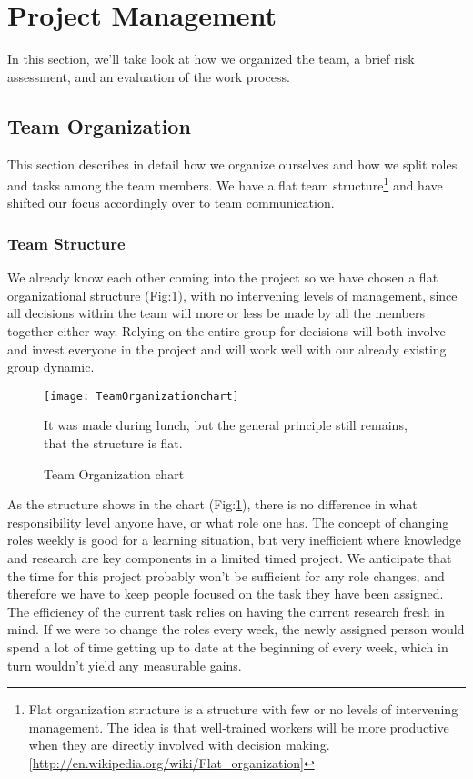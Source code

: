 \section{Project Management}\label{Project Management} 
    In this section, we'll take look at how we organized the team, a brief risk assessment, and an evaluation of the work process. 
    
    \subsection{Team Organization}\label{Team Organization} 
        This section describes in detail how we organize ourselves and how we split roles and tasks among the team members. We have a flat team structure\footnote{Flat organization structure is a structure with few or no levels of intervening management. The idea is that well-trained workers will be more productive when they are directly involved with decision making. [\url{http://en.wikipedia.org/wiki/Flat_organization}]}  and have shifted our focus accordingly over to team communication. 
    
    \subsubsection{Team Structure}\label{Team Structure}
    We already know each other coming into the project so we have chosen a flat organizational structure (Fig:\ref{fig:TeamOrganizationchart}), with no intervening levels of management, since all decisions within the team will more or less be made by all the members together either way. Relying on the entire group for decisions will both involve and invest everyone in the project and will work well with our already existing group dynamic.

    \begin{figure}[H]
        \centering
        \texttt{[image: TeamOrganizationchart]}
        \caption{Team Organization chart}
        It was made during lunch, but the general principle still remains, that the structure is flat.
        \label{fig:TeamOrganizationchart}
    \end{figure}
    
    As the structure shows in the chart (Fig:\ref{fig:TeamOrganizationchart}), there is no difference in what responsibility level anyone have, or what role one has. The concept of changing roles weekly is good for a learning situation, but very inefficient where knowledge and research are key components in a limited timed project. We anticipate that the time for this project probably won't be sufficient for any role changes, and therefore we have to keep people focused on the task they have been assigned. The efficiency of the current task relies on having the current research fresh in mind. If we were to change the roles every week, the newly assigned person would spend a lot of time getting up to date at the beginning of every week, which in turn wouldn't yield any measurable gains. 
    
